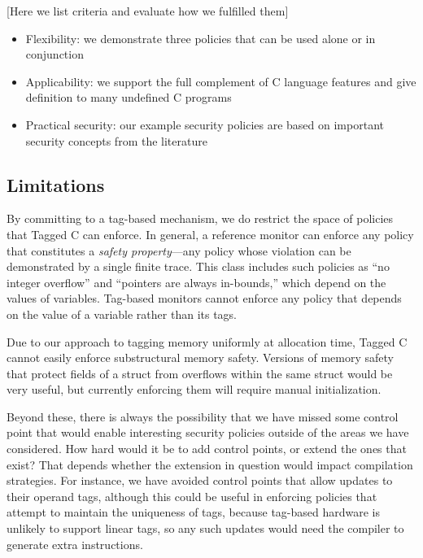 \documentclass{llncs}
\begin{document}
{[Here we list criteria and evaluate how we fulfilled them]

\begin{itemize}
\item Flexibility: we demonstrate three policies that can be used alone or in conjunction
\item Applicability: we support the full complement of C language features and give definition
  to many undefined C programs
\item Practical security: our example security policies are based on important security concepts
  from the literature
\end{itemize}

\subsection{Limitations}

By committing to a tag-based mechanism, we do restrict the space of policies that Tagged C
can enforce. In general, a reference monitor can enforce any policy that constitutes a
{\em safety property}---any policy whose violation can be demonstrated by a single finite
trace. This class includes such policies as ``no integer overflow'' and ``pointers are always in-bounds,''
which depend on the values of variables. Tag-based monitors cannot enforce any policy that
depends on the value of a variable rather than its tags. 


Due to our approach to tagging memory uniformly at allocation time, Tagged C cannot easily
enforce substructural memory safety. Versions of memory safety that protect fields of a
struct from overflows within the same struct would be very useful, but currently enforcing
them will require manual initialization.

Beyond these, there is always the possibility that we have missed some control point
that would enable interesting security policies outside of the areas we have considered.
How hard would it be to add control points, or extend the ones that exist? That depends
whether the extension in question would impact compilation strategies. For instance,
we have avoided control points that allow updates to their operand tags, although
this could be useful in enforcing policies that attempt to maintain the uniqueness of tags,
because tag-based hardware is unlikely to support linear tags, so any such updates would
need the compiler to generate extra instructions.

}
\end{document}
